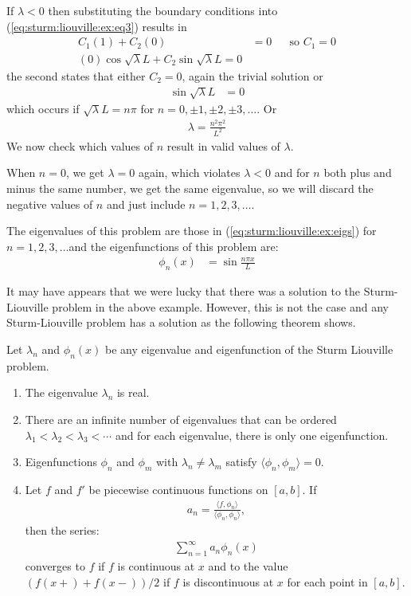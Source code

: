 \begin{example}
If $\lambda<0$ then substituting the boundary conditions into (\ref{eq:sturm:liouville:ex:eq3}) results in 
%
\begin{align*}
C_1 (1) + C_2 (0) & = 0 && \text{so $C_1=0$} \\
(0) \cos \sqrt{\lambda} L + C_2 \sin \sqrt{\lambda} L = 0 
\end{align*}
the second states that either $C_2=0$, again the trivial solution or
% 
\begin{align*}
\sin \sqrt{\lambda} L & = 0 
\end{align*}
which occurs if $\sqrt{\lambda} L = n \pi$ for $n=0,\pm 1, \pm 2, \pm 3, \ldots$.   Or
% 
\begin{align} \label{eq:sturm:liouville:ex:eigs}
\lambda = \frac{n^2 \pi^2}{L^2} 
\end{align}
We now check which values of $n$ result in valid values of $\lambda$.  

When $n=0$, we get $\lambda=0$ again, which violates $\lambda<0$ and for $n$ both plus and minus the same number, we get the same eigenvalue, so we will discard the negative values of $n$ and just include $n=1,2,3, \ldots. $  

The eigenvalues of this problem are those in (\ref{eq:sturm:liouville:ex:eigs}) for $n=1,2,3,\ldots$and the eigenfunctions of this problem are:
%
\begin{align*}
\phi_n(x) & = \sin \frac{n\pi x}{L}  
\end{align*}

\end{example}

It may have appears that we were lucky that there was a solution to the Sturm-Liouville problem in the above example.  However, this is not the case and any Sturm-Liouville problem has a solution as the following theorem shows.  


\begin{theorem} \label{thm:sturm:liouville}
Let $\lambda_n$ and $\phi_n(x)$ be any eigenvalue and eigenfunction of the Sturm Liouville problem.  
\begin{enumerate}
\item The eigenvalue $\lambda_n$ is real. 
\item There are an infinite number of eigenvalues that can be ordered $\lambda_1 < \lambda_2< \lambda_3 < \cdots $ and for each eigenvalue, there is only one eigenfunction. 
\item Eigenfunctions $\phi_n$ and $\phi_m$ with $\lambda_n \neq \lambda_m$ satisfy $\langle \phi_n , \phi_m \rangle = 0$.  
\item Let $f$ and $f'$ be piecewise continuous functions on $[a,b]$.  If 
\begin{align*}
a_n = \frac{\langle f,\phi_n \rangle }{ \langle \phi_n, \phi_n \rangle},
\end{align*}
then the series:
% 
\begin{align*}
\sum_{n=1}^{\infty}a_n \phi_n(x)  
\end{align*}
converges to $f$ if $f$ is continuous at $x$ and to the value $(f(x+)+f(x-))/2$ if $f$ is discontinuous at $x$ for each point in $[a,b]$.  
\end{enumerate}
\end{theorem}

